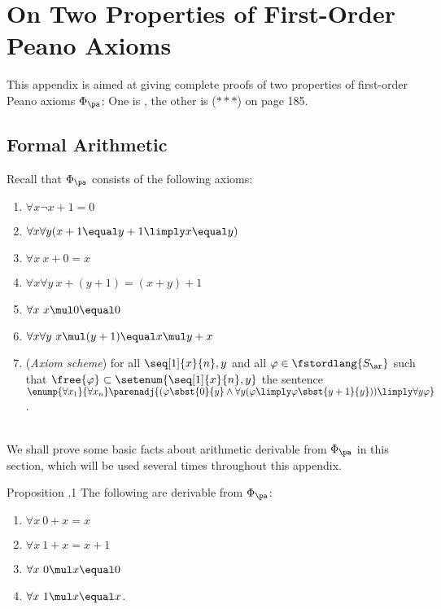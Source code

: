 \chapter{On Two Properties of First-Order Peano Axioms}
This appendix is aimed at giving complete proofs of two properties of first-order Peano axioms $\Phi_\pa$: One is , the other is ($\ast\ast\ast$) on page 185.
\section{Formal Arithmetic}
Recall that $\Phi_\pa$ consists of the following axioms:
\begin{enumerate}[({PA}1)]
%
\item $\forall x \neg x + 1 \equal 0$
%
\item $\forall x \forall y (x + 1 \equal y + 1 \limply x \equal y)$
%
\item $\forall x \ x + 0 \equal x$
%
\item $\forall x \forall y \ x + (y + 1) \equal (x + y) + 1$
%
\item $\forall x \ x \mul 0 \equal 0$
%
\item $\forall x \forall y \ x \mul (y + 1) \equal x \mul y + x$
%
\item (\emph{Axiom scheme}) for all $\seq[1]{x}{n}, y$ and all $\varphi \in \fstordlang{S_\ar}$ such that $\free{\varphi} \subset \setenum{\seq[1]{x}{n}, y}$ the sentence\\$\enump{\forall x_1}{\forall x_n} \parenadj{(\varphi\sbst{0}{y} \land \forall y (\varphi \limply \varphi\sbst{y + 1}{y})) \limply \forall y \varphi}$.
%
\end{enumerate}\ \smallskip\\
We shall prove some basic facts about arithmetic derivable from $\Phi_\pa$ in this section, which will be used several times throughout this appendix.\bigskip\\
\begin{theorem}{Proposition \thesection.1}
The following are derivable from $\Phi_\pa$:
\begin{enumerate}[\rm(a)]
%
\item\label{FA1} $\forall x \ 0 + x \equal x$
%
\item\label{FA2} $\forall x \ 1 + x \equal x + 1$
%
\item\label{FA3} $\forall x \ 0 \mul x \equal 0$
%
\item\label{FA4} $\forall x \ 1 \mul x \equal x$.
%
\end{enumerate}
\end{theorem}
